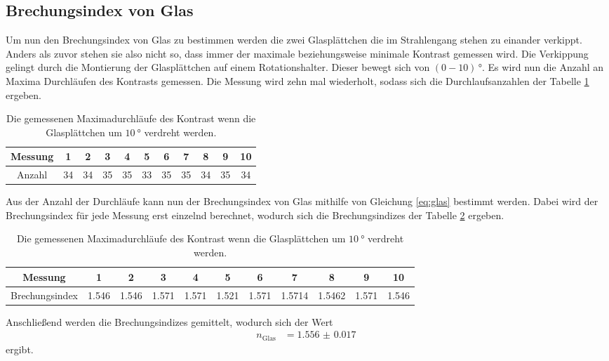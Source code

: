\subsection{Brechungsindex von Glas}
Um nun den Brechungsindex von Glas zu bestimmen werden die zwei Glasplättchen die im Strahlengang stehen zu einander verkippt.
Anders als zuvor stehen sie also nicht so, dass immer der maximale beziehungsweise minimale Kontrast gemessen wird.
Die Verkippung gelingt durch die Montierung der Glasplättchen auf einem Rotationshalter.
Dieser bewegt sich von $(0-10)\,\si{\degree}$.
Es wird nun die Anzahl an Maxima Durchläufen des Kontrasts gemessen.
Die Messung wird zehn mal wiederholt, sodass sich die Durchlaufsanzahlen der Tabelle \ref{tab:counts_glas} ergeben.
\begin{table}
    \centering
    \begin{tabular}{ccccccccccc}
        \toprule 
        Messung & 1&2&3&4&5&6&7&8&9&10\\
        \midrule
        Anzahl &34 & 34& 35& 35& 33& 35& 35& 34& 35& 34\\
        \bottomrule
    \end{tabular}
    \caption{Die gemessenen Maximadurchläufe des Kontrast wenn die Glasplättchen um $\SI{10}{\degree}$ verdreht werden.}
    \label{tab:counts_glas}
\end{table}
Aus der Anzahl der Durchläufe kann nun der Brechungsindex von Glas mithilfe von Gleichung \eqref{eq:glas} bestimmt werden.
Dabei wird der Brechungsindex für jede Messung erst einzelnd berechnet, wodurch sich die Brechungsindizes der Tabelle \ref{tab:n_glas} ergeben.
\begin{table}
    \hspace*{-1cm}
    \begin{tabular}{ccccccccccc}
        \toprule 
        Messung & 1&2&3&4&5&6&7&8&9&10\\
        \midrule
        Brechungsindex &1.546&1.546&1.571&1.571&1.521&1.571& 1.5714&1.5462&1.571& 1.546\\
        \bottomrule
    \end{tabular}
    \caption{Die gemessenen Maximadurchläufe des Kontrast wenn die Glasplättchen um $\SI{10}{\degree}$ verdreht werden.}
    \label{tab:n_glas}
\end{table}
\FloatBarrier\noindent
Anschließend werden die Brechungsindizes gemittelt, wodurch sich der Wert 
\begin{align*}
    n_\text{Glas} &= \SI{1.556(17)}{}
\end{align*}
ergibt.
